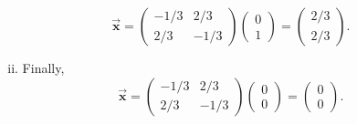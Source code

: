 \documentclass[12pt]{article} %
\newcommand{\vecx}{\vec{\boldsymbol{x}}}
\begin{document}
\begin{solution}
\begin{enumerate}[(a)]
\begin{enumerate}[i.]
\[        \vecx = \begin{pmatrix} -1/3 & 2/3 \\ 2/3 & -1/3 \end{pmatrix} \begin{pmatrix} 0 \\ 1 \end{pmatrix} = \begin{pmatrix} 2/3 \\ 2/3 \end{pmatrix}.
        \]
        \item Finally,
        \[
        \vecx = \begin{pmatrix} -1/3 & 2/3 \\ 2/3 & -1/3 \end{pmatrix} \begin{pmatrix} 0 \\ 0 \end{pmatrix} = \begin{pmatrix} 0 \\ 0 \end{pmatrix}.
        \]        
    \end{enumerate}
\end{enumerate}
\end{solution}
\end{document}
